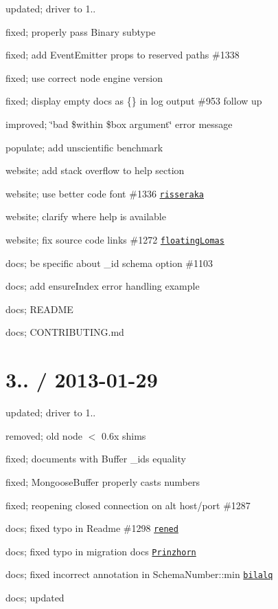 \begin{DoxyItemize}
\item updated; driver to 1..
\item fixed; properly pass Binary subtype
\item fixed; add Event\+Emitter props to reserved paths \#1338
\item fixed; use correct node engine version
\item fixed; display empty docs as \{\} in log output \#953 follow up
\item improved; \char`\"{}bad \$within \$box argument\char`\"{} error message
\item populate; add unscientific benchmark
\item website; add stack overflow to help section
\item website; use better code font \#1336 \href{https://github.com/risseraka}{\tt risseraka}
\item website; clarify where help is available
\item website; fix source code links \#1272 \href{https://github.com/floatingLomas}{\tt floating\+Lomas}
\item docs; be specific about \+\_\+id schema option \#1103
\item docs; add ensure\+Index error handling example
\item docs; R\+E\+A\+D\+ME
\item docs; C\+O\+N\+T\+R\+I\+B\+U\+T\+I\+N\+G.\+md
\end{DoxyItemize}

\section*{3.. / 2013-\/01-\/29 }


\begin{DoxyItemize}
\item updated; driver to 1..
\item removed; old node $<$ 0.\+6x shims
\item fixed; documents with Buffer \+\_\+ids equality
\item fixed; Mongoose\+Buffer properly casts numbers
\item fixed; reopening closed connection on alt host/port \#1287
\item docs; fixed typo in Readme \#1298 \href{https://github.com/rened}{\tt rened}
\item docs; fixed typo in migration docs \href{https://github.com/Prinzhorn}{\tt Prinzhorn}
\item docs; fixed incorrect annotation in Schema\+Number\+::min \href{https://github.com/bilalq}{\tt bilalq}
\item docs; updated
\end{DoxyItemize}

